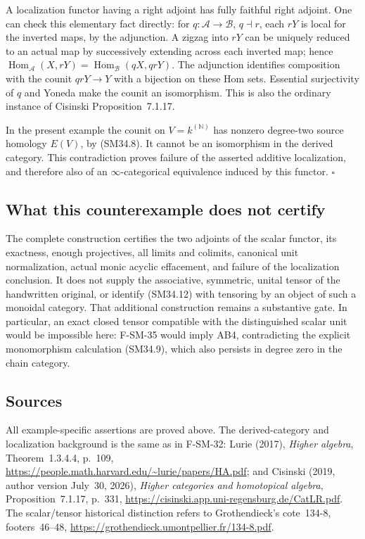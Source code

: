 A localization functor having a right adjoint has fully
faithful right adjoint.  One can check this elementary fact
directly: for \(q:\mathcal A\to\mathcal B\),
\(q\dashv r\), each \(rY\) is local for the inverted
maps, by the adjunction.  A zigzag into \(rY\) can be
uniquely reduced to an actual map by successively extending
across each inverted map; hence
\(\operatorname{Hom}_{\mathcal A}(X,rY)=
\operatorname{Hom}_{\mathcal B}(qX,qrY)\).
The adjunction identifies composition with the counit
\(qrY\to Y\) with a bijection on these Hom sets.
Essential surjectivity of \(q\) and Yoneda make the
counit an isomorphism.  This is also the ordinary instance
of Cisinski Proposition~7.1.17.

In the present example the counit on
\(V=k^{(\mathbb N)}\) has nonzero degree-two source
homology \(E(V)\), by (SM34.8).  It cannot be an
isomorphism in the derived category.  This contradiction
proves failure of the asserted additive localization,
and therefore also of an \(\infty\)-categorical
equivalence induced by this functor. \(\square\)

\subsection{What this counterexample does not certify}
The complete construction certifies the two adjoints of the
scalar functor, its exactness, enough projectives, all limits and colimits,
canonical unit normalization, actual monic acyclic
effacement, and failure of the localization conclusion.
It does not supply the associative, symmetric, unital
tensor of the handwritten original, or identify (SM34.12)
with tensoring by an object of such a monoidal category.
That additional construction remains a substantive gate.
In particular, an exact closed tensor compatible with
the distinguished scalar unit would be impossible here:
F-SM-35 would imply AB4, contradicting the explicit
monomorphism calculation (SM34.9), which also persists in
degree zero in the chain category.

\subsection{Sources}
All example-specific assertions are proved above.  The
derived-category and localization background is the same
as in F-SM-32: Lurie (2017), \emph{Higher algebra},
Theorem~1.3.4.4, p.~109,
\url{https://people.math.harvard.edu/~lurie/papers/HA.pdf};
and Cisinski (2019, author version July~30, 2026),
\emph{Higher categories and homotopical algebra},
Proposition~7.1.17, p.~331,
\url{https://cisinski.app.uni-regensburg.de/CatLR.pdf}.
The scalar/tensor historical distinction refers to
Grothendieck's cote~134-8, footers~46--48,
\url{https://grothendieck.umontpellier.fr/134-8.pdf}.
